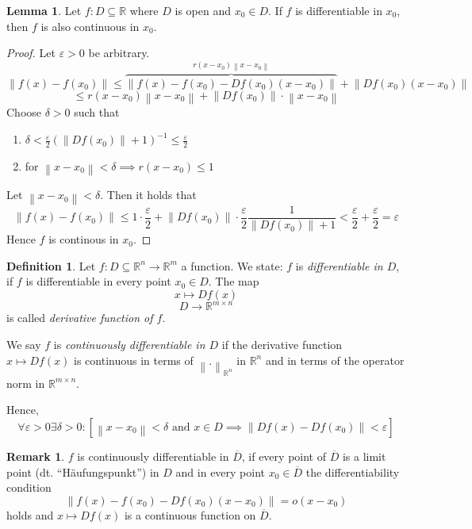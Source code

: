 \documentclass[a4paper,landscape,twocolumn]{article}
\theoremstyle{definition}
\newtheorem{defi}{Definition}
\newtheorem{rem}{Remark}
\newtheorem{lemma}{Lemma}
\newcommand\norm[1]{\left\|#1\right\|}
\begin{document}
\begin{lemma}
  Let $f: D \subseteq \mathbb R$ where $D$ is open and $x_0 \in D$.
  If $f$ is differentiable in $x_0$, then $f$ is also continuous in $x_0$.
\end{lemma}
\begin{proof}
  Let $\varepsilon > 0$ be arbitrary.
  \[ \norm{f(x) - f(x_0)} \leq \overbrace{\norm{f(x) - f(x_0) - Df(x_0)(x - x_0)}}^{r(x - x_0) \norm{x - x_0}} + \norm{Df(x_0) (x - x_0)} \]
  \[ \leq r (x - x_0) \norm{x - x_0} + \norm{Df(x_0)} \cdot \norm{x - x_0} \]
  Choose $\delta > 0$ such that
  \begin{enumerate}
  \item $\delta < \frac\varepsilon2 \left(\norm{Df(x_0)} + 1\right)^{-1} \leq \frac{\varepsilon}{2}$
  \item for $\norm{x - x_0} < \delta \implies r(x - x_0) \leq 1$
  \end{enumerate}
  Let $\norm{x - x_0} < \delta$. Then it holds that
  \[ \norm{f(x) - f(x_0)} \leq 1 \cdot \frac{\varepsilon}{2} + \norm{Df(x_0)} \cdot \frac{\varepsilon}{2} \frac{1}{\norm{Df(x_0)} + 1} < \frac{\varepsilon}{2} + \frac{\varepsilon}{2} = \varepsilon \]
  Hence $f$ is continous in $x_0$.
\end{proof}

\begin{defi}
  Let $f: D \subseteq \mathbb R^n \to \mathbb R^m$ a function.
  We state: $f$ is \emph{differentiable in $D$}, if $f$ is
  differentiable in every point $x_0 \in D$. The map
  \[ x \mapsto Df(x) \]
  \[ D \to \mathbb R^{m\times n} \]
  is called \emph{derivative function of $f$}.

  We say $f$ is \emph{continuously differentiable in $D$}
  if the derivative function $x \mapsto Df(x)$ is continuous in terms of $\norm{.}_{\mathbb R^n}$ in $\mathbb R^n$ and
  in terms of the operator norm in $\mathbb R^{m\times n}$.

  Hence,
  \[ \forall \varepsilon > 0 \exists \delta > 0:
  \left[\norm{x - x_0} < \delta \text{ and } x \in D \implies \norm{Df(x) - Df(x_0)} < \varepsilon\right]
  \]
\end{defi}

\begin{rem}
  $f$ is continuously differentiable in $\overline{D}$,
  if every point of $\overline{D}$ is a limit point (dt. \enquote{H\"aufungspunkt}) in $D$ and
  in every point $x_0 \in \overline{D}$ the differentiability condition
  \[ \norm{f(x) - f(x_0) - Df(x_0)(x - x_0)} = o(x - x_0) \]
  holds and $x \mapsto Df(x)$ is a continuous function on $\overline{D}$.
\end{rem}
\end{document}
